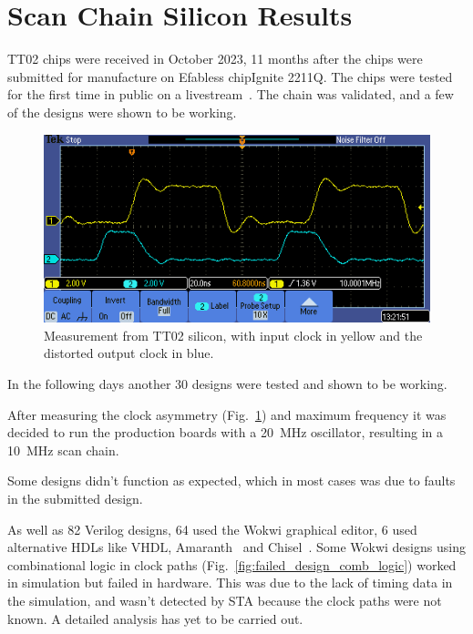 \section{Scan Chain Silicon Results}
\label{sec:scan_chain_res}

TT02 chips were received in October 2023, 11 months after the chips were submitted for manufacture on Efabless chipIgnite 2211Q.
The chips were tested for the first time in public on a livestream~\cite{siliconalive}.
The chain was validated, and a few of the designs were shown to be working.

\begin{figure}[!t]
\centering
\includegraphics[width=\columnwidth]{./Figs/tt02_clock_out.png}
\caption{Measurement from TT02 silicon, with input clock in yellow and the distorted output clock in blue.}
\label{fig:TT02_clock_out}
\end{figure}

In the following days another 30 designs were tested and shown to be working.

After measuring the clock asymmetry (Fig.~\ref{fig:TT02_clock_out}) and maximum frequency it was decided to run the production boards with a \qty{20}{\MHz} oscillator, resulting in a \qty{10}{\MHz} scan chain.

Some designs didn’t function as expected, which in most cases was due to faults in the submitted design.

As well as 82 Verilog designs, 64 used the Wokwi graphical editor, 6 used alternative HDLs like VHDL, Amaranth~\cite{amaranth} and Chisel~\cite{chisel}.
Some Wokwi designs using combinational logic in clock paths (Fig.~\ref{fig:failed_design_comb_logic}) worked in simulation but failed in hardware.
This was due to the lack of timing data in the simulation, and wasn’t detected by STA because the clock paths were not known. A detailed analysis has yet to be carried out.

